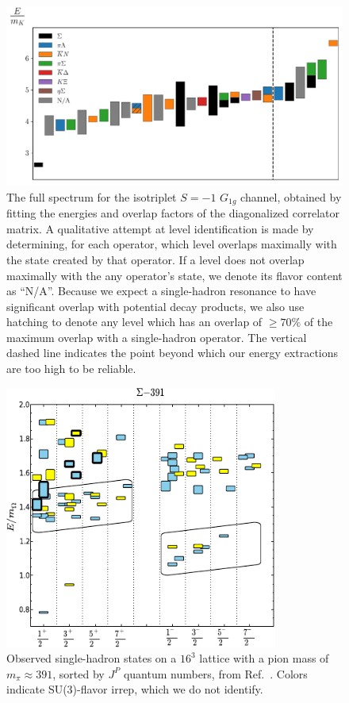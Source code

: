 \begin{figure}[H]
    \centering
    \hspace*{-0.5in}\includegraphics[width=\textwidth]{figures/sigmas/g1g/staircase_mk.pdf}
    \caption{The full spectrum for the isotriplet $S=-1$ $G_{1g}$ channel, obtained by fitting the energies and overlap factors of the diagonalized correlator matrix. A qualitative attempt at level identification is made by determining, for each operator, which level overlaps maximally with the state created by that operator. If a level does not overlap maximally with the any operator's state, we denote its flavor content as ``N/A''. Because we expect a single-hadron resonance to have significant overlap with potential decay products, we also use hatching to denote any level which has an overlap of $\geq 70\%$ of the maximum overlap with a single-hadron operator. The vertical dashed line indicates the point beyond which our energy extractions are too high to be reliable.}\label{fig:g1g_spectrum}
\end{figure}

\begin{figure}[H]
    \centering
    \hspace*{-1cm}\includegraphics[width=0.8\textwidth]{figures/edwards.pdf}
    \caption{Observed single-hadron states on a $16^3$ lattice with a pion mass of $m_\pi \approx 391$, sorted by $J^P$ quantum numbers, from Ref.~\cite{Edwards:2012fx}. Colors indicate SU(3)-flavor irrep, which we do not identify.}\label{fig:edwards}
\end{figure}

